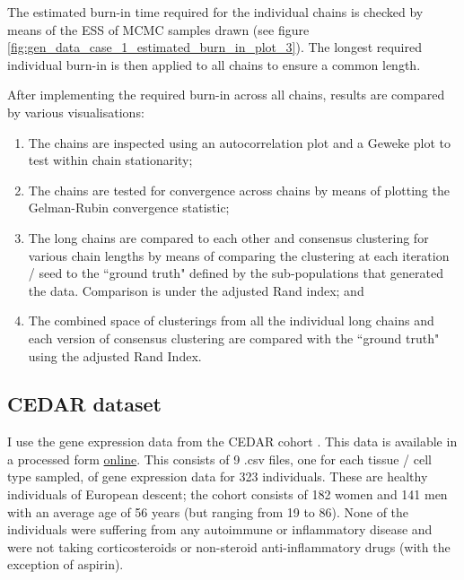 \documentclass[14pt]{extarticle} %
\begin{document}
	The estimated burn-in time required for the individual chains is checked by means of the ESS of MCMC samples drawn (see figure \ref{fig:gen_data_case_1_estimated_burn_in_plot_3}). The longest required individual burn-in is then applied to all chains to ensure a common length.
	
	After implementing the required burn-in across all chains, results are compared by various visualisations:
	
	\begin{enumerate}
		\item The chains are inspected using an autocorrelation plot and a Geweke plot to test within chain stationarity;
		\item The chains are tested for convergence across chains by means of plotting the Gelman-Rubin convergence statistic;
		\item The long chains are compared to each other and consensus clustering for various chain lengths by means of comparing the clustering at each iteration / seed to the ``ground truth" defined by the sub-populations that generated the data. Comparison is under the adjusted Rand index; and
		\item The combined space of clusterings from all the individual long chains and each version of consensus clustering are compared with the ``ground truth" using the adjusted Rand Index.
	\end{enumerate}
	
	
	\subsection{CEDAR dataset}
	I use the gene expression data from the CEDAR cohort \citep{TheInternationalIBDGeneticsConsortiumIBDriskloci2018}. This data is available in a processed form \href{http://139.165.108.18/srv/genmol/permanent/1be6993fe41c12a051c9244d67c91da2be49e5dd26a6cd79f442bc006971e2ef/crohn-index.html}{online}. This consists of 9 .csv files, one for each tissue / cell type sampled, of gene expression data for 323 individuals. These are healthy individuals of European descent; the cohort consists of 182 women and 141 men with an average age of 56 years (but ranging from 19 to 86). None of the individuals were suffering from any autoimmune or inflammatory disease and were not taking corticosteroids or non-steroid anti-inflammatory drugs (with the exception of aspirin). 
	
\end{document}
